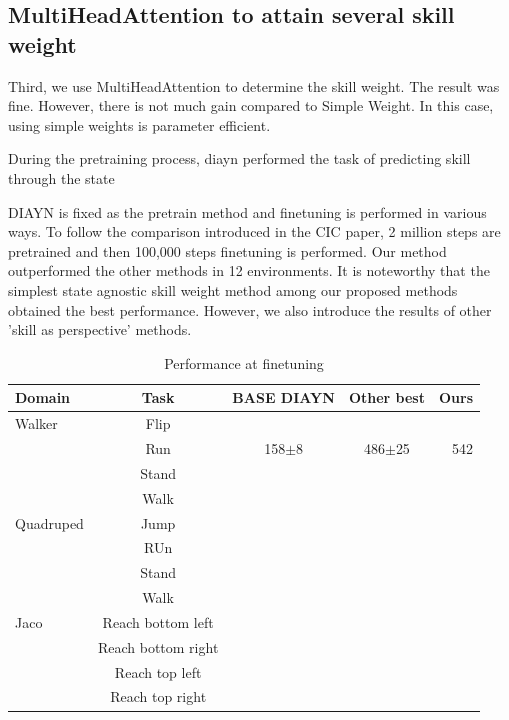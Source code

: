 \subsection{MultiHeadAttention to attain several skill weight}
Third, we use MultiHeadAttention to determine the skill weight.
The result was fine. However, there is not much gain compared to Simple Weight. In this case, using simple weights is parameter efficient.

During the pretraining process, diayn performed the task of predicting skill through the state








DIAYN is fixed as the pretrain method and finetuning is performed in various ways.
To follow the comparison introduced in the CIC paper, 2 million steps are pretrained and then 100,000 steps finetuning is performed.
Our method outperformed the other methods in 12 environments.
It is noteworthy that the simplest state agnostic skill weight method among our proposed methods obtained the best performance.
However, we also introduce the results of other 'skill as perspective' methods.
\begin{table}[t]
  \caption{Performance at finetuning}
  \label{finetuning result}
  \vskip 0.15in
  \begin{center}
  \begin{small}
  \begin{sc}
  \begin{tabular}{lcccr}
  \toprule
  Domain & Task & BASE DIAYN & Other best & Ours \\
  \midrule
  Walker & Flip    &  \\
   & Run    & 158$\pm$8 & 486$\pm$25 & 542\\
   & Stand    &  \\
   & Walk    &  \\
  Quadruped & Jump    &  \\
   & RUn    &  \\
   & Stand    &  \\
   & Walk   &  \\
  Jaco & Reach bottom left    &  \\
   & Reach bottom right   &  \\
   & Reach top left    & \\
   & Reach top right   &  \\
  
  
  
  
  \bottomrule
  \end{tabular}
  \end{sc}
  \end{small}
  \end{center}
  \vskip -0.1in
  \end{table}


